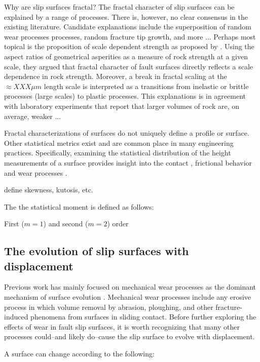 \documentclass[12pt,a4paper]{article}
\begin{document}
Why are slip surfaces fractal? The fractal character of slip surfaces can be explained by a range of processes. There is, however, no clear consensus in the existing literature. Candidate explanations include the superposition of random wear processes processes, random fracture tip growth, and more ... Perhaps most topical is the proposition of scale dependent strength as proposed by \citet{brodsky2016scale}. Using the aspect ratios of geometrical asperities as a measure of rock strength at a given scale, they argued that fractal character of fault surfaces directly reflects a scale dependence in rock strength. Moreover, a break in fractal scaling at the $\approx XXX \mu m$ length scale is interpreted as a transitions from inelastic or brittle processes (large scales) to plastic processes. This explanations is in agreement with laboratory experiments that report that larger volumes of rock are, on average, weaker ...

Fractal characterizations of surfaces do not uniquely define a profile or surface. Other statistical metrics exist and are common place in many engineering practices. Specifically, examining the statistical distribution of the height measurements of a surface provides insight into the contact \cite{greenwood1966}, frictional behavior \cite{XXX} and wear processes \cite{archard1953contact}.

define skewness, kutosis, etc.

The the statistical moment is defined as follows:

First ($m=1$) and second ($m=2$) order  



\subsection{The evolution of slip surfaces with displacement}

Previous work has mainly focused on mechanical wear processes as the dominant mechanism of surface evolution \cite{power1988roughness, sagy2007evolution, brodsky2011faults}. Mechanical wear processes include any erosive process in which volume removal by abrasion,  ploughing, and other fracture-induced phenomena from surfaces in sliding contact. Before further exploring the effects of wear in fault slip surfaces, it is worth recognizing that many other processes could--and likely do--cause the slip surface to evolve with displacement.

A surface can change according to the following:
\end{document}
